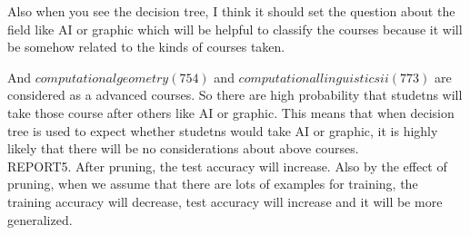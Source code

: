 \documentclass[a4 paper]{article}
\numberwithin{equation}{section}
\newcommand{\0}{\mathbf{0}}
\begin{document}
Also when you see the decision tree, I think it should set the question about the field like AI or graphic which will be helpful to classify the courses because it will be somehow related to the kinds of courses taken.

And $computational geometry (754) $ and $computational linguistics ii (773)$ are considered as a advanced courses. So there are high probability that studetns will take those course after others like AI or graphic. This means that when decision tree is used to expect whether studetns would take AI or graphic, it is highly likely that there will be no considerations about above courses.
\\[3mm]
REPORT5. 
After pruning, the test accuracy will increase. Also by the effect of pruning, when we assume that there are lots of examples for training, the training accuracy will decrease, test accuracy will increase and it will be more generalized.
\end{document}
